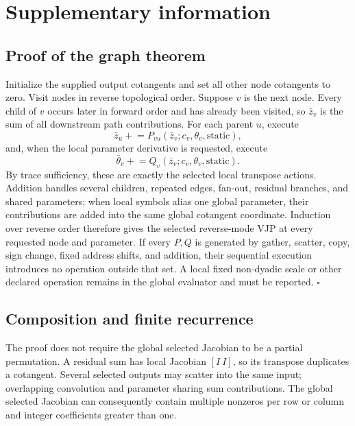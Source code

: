 \clearpage
\appendix
\section{Supplementary information}

\subsection{Proof of the graph theorem}
\label{supp:proof}

Initialize the supplied output cotangents and set all other node cotangents to
zero.  Visit nodes in reverse topological order.  Suppose $v$ is the next node.
Every child of $v$ occurs later in forward order and has already been visited,
so $\bar z_v$ is the sum of all downstream path contributions.  For each
parent $u$, execute
\begin{equation}
 \bar z_u\mathrel{+}=P_{vu}(\bar z_v;c_v,\theta_v,\mathrm{static}),
\end{equation}
and, when the local parameter derivative is requested, execute
\begin{equation}
 \bar\theta_v\mathrel{+}=Q_v(\bar z_v;c_v,\theta_v,\mathrm{static}).
\end{equation}
By trace sufficiency, these are exactly the selected local transpose actions.
Addition handles several children, repeated edges, fan-out, residual branches,
and shared parameters; when local symbols alias one global parameter, their
contributions are added into the same global cotangent coordinate.  Induction
over reverse order therefore gives the selected reverse-mode VJP at every
requested node and parameter.  If every
$P,Q$ is generated by gather, scatter, copy, sign change, fixed address shifts,
and addition, their sequential execution introduces no operation outside that
set.  A local fixed non-dyadic scale or other declared operation remains in the
global evaluator and must be reported. \hfill$\square$

\subsection{Composition and finite recurrence}

The proof does not require the global selected Jacobian to be a partial
permutation.  A residual sum has local Jacobian $[I\ I]$, so its transpose
duplicates a cotangent.  Several selected outputs may scatter into the same
input; overlapping convolution and parameter sharing sum contributions.  The
global selected Jacobian can consequently contain multiple nonzeros per row or
column and integer coefficients greater than one.

